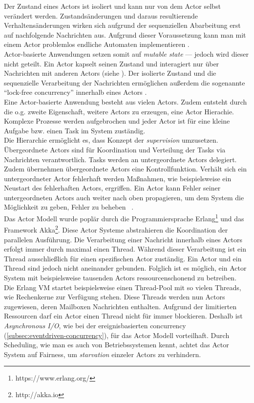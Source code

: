 Der Zustand eines Actors ist isoliert und kann nur von dem Actor selbst verändert werden. Zustandsänderungen und daraus resultierende Verhaltensänderungen wirken sich aufgrund der sequenziellen Abarbeitung erst auf nachfolgende Nachrichten aus. Aufgrund dieser Voraussetzung kann man mit einem Actor problemlos endliche Automaten implementieren \cite[S.~14]{vernon_reactive_2016} \cite[S.~84]{kuhn_reactive_2015}.\\
Actor-basierte Anwendungen setzen somit auf \textit{mutable state} --- jedoch wird dieser nicht geteilt. Ein Actor kapselt seinen Zustand und interagiert nur über Nachrichten mit anderen Actors (siehe ). Der isolierte Zustand und die sequenzielle Verarbeitung der Nachrichten ermöglichen außerdem die sogenannte \enquote{lock-free concurrency} innerhalb eines Actors \cite[S.~85]{kuhn_reactive_2015}.\\
Eine Actor-basierte Anwendung besteht aus vielen Actors. Zudem entsteht durch die o.g. zweite Eigenschaft, weitere Actors zu erzeugen, eine Actor Hierachie. Komplexe Prozesse werden aufgebrochen und jeder Actor ist für eine kleine Aufgabe bzw. einen Task im System zuständig.\\
Die Hierarchie ermöglicht es, dass Konzept der \textit{supervision} umzusetzen. Übergeordnete Actors sind für Koordination und Verteilung der Tasks via Nachrichten verantwortlich. Tasks werden an untergeordnete Actors delegiert. Zudem übernehmen übergeordnete Actors eine Kontrollfunktion. Verhält sich ein untergeordneter Actor fehlerhaft werden Maßnahmen, wie beispielsweise ein Neustart des fehlerhaften Actors, ergriffen. Ein Actor kann Fehler seiner untergeordneten Actors auch weiter nach oben propagieren, um dem System die Möglichkeit zu geben, Fehler zu beheben~\cite[S.~15]{vernon_reactive_2016} \cite[S.~83]{kuhn_reactive_2015} \cite[S.~86]{erb_concurrent_2012}.\\

Das Actor Modell wurde poplär durch die Programmiersprache Erlang\footnote{https://www.erlang.org/} und das Framework Akka\footnote{http://akka.io}. Diese Actor Systeme abstrahieren die Koordination der parallelen Ausführung. Die Verarbeitung einer Nachricht innerhalb eines Actors erfolgt immer durch maximal einen Thread. Während dieser Verarbeitung ist ein Thread ausschließlich für einen spezifischen Actor zuständig. Ein Actor und ein Thread sind jedoch nicht aneinander gebunden. Folglich ist es möglich, ein Actor System mit beispielsweise tausenden Actors ressourcenschonend zu betreiben.\\
Die Erlang VM startet beispielsweise einen Thread-Pool mit so vielen Threads, wie Rechenkerne zur Verfügung stehen. Diese Threads werden nun Actors zugewiesen, deren Mailboxen Nachrichten enthalten. Aufgrund der limitierten Ressourcen darf ein Actor einen Thread nicht für immer blockieren. Deshalb ist \textit{Asynchronous I/O}, wie bei der ereignisbasierten \gls{concurrency} (\ref{subsec:eventdriven-concurrency}), für das Actor Modell vorteilhaft. Durch Scheduling, wie man es auch von Betriebssystemen kennt, achtet das Actor System auf Fairness, um \textit{starvation} einzeler Actors zu verhindern.\\

